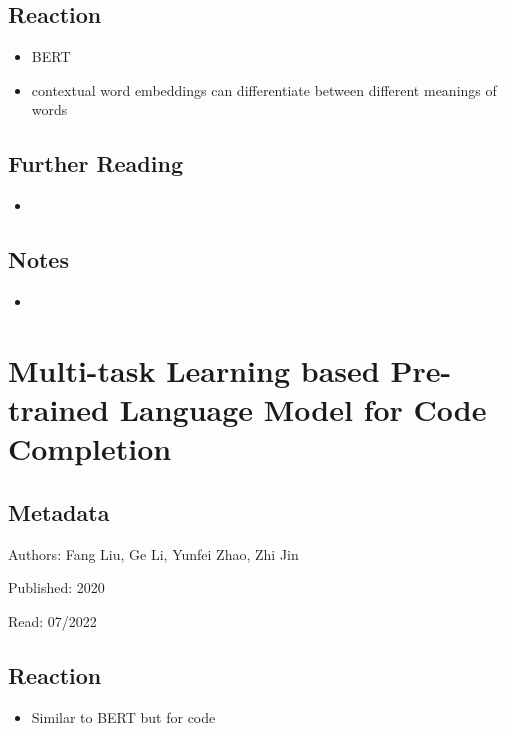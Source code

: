 \documentclass{article}
\begin{document}
\subsection*{Reaction}
\begin{itemize}
\item BERT
\item contextual word embeddings can differentiate between different meanings of words
\end{itemize}

\subsection*{Further Reading}
\begin{itemize}
	\item
\end{itemize}

\subsection*{Notes}

\begin{itemize}
	\item
\end{itemize}

\pagebreak


\section*{Multi-task Learning based Pre-trained Language Model for Code Completion}

\subsection*{Metadata}

\noindent Authors: Fang Liu, Ge Li, Yunfei Zhao, Zhi Jin

\noindent Published: 2020

\noindent Read: 07/2022

\subsection*{Reaction}
\begin{itemize}
\item Similar to BERT but for code
\end{itemize}
\end{document}
